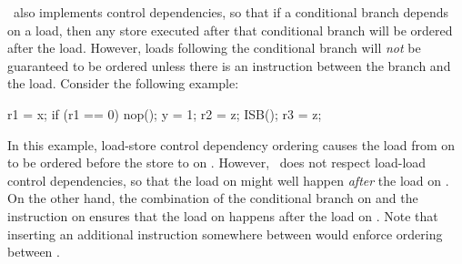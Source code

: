 \ARM\ also implements control dependencies, so that if a conditional
branch depends on a load, then any store executed after that conditional
branch will be ordered after the load.
However, loads following the conditional branch will \emph{not}
be guaranteed to be ordered unless there is an 
instruction between the branch and the load.
Consider the following example:

\begin{fcvlabel}
\begin{VerbatimN}[commandchars=\\\[\]]
r1 = x;			\lnlbl[x]
if (r1 == 0)		\lnlbl[if]
	nop();		\lnlbl[nop]
y = 1;			\lnlbl[y]
r2 = z;			\lnlbl[z1]
ISB();			\lnlbl[isb]
r3 = z;			\lnlbl[z2]
\end{VerbatimN}
\end{fcvlabel}

\begin{fcvref}
In this example, load-store control dependency ordering causes
the load from  on  to be ordered before the store to
 on .
However, \ARM\ does not respect load-load control dependencies, so that
the load on  might well happen \emph{after} the
load on .
On the other hand, the combination of the conditional branch on 
and the  instruction on  ensures that
the load on  happens after the load on .
Note that inserting an additional  instruction somewhere between
 would enforce ordering between .
\end{fcvref}

\subsection{}
\label{sec:memorder:ARMv8}

